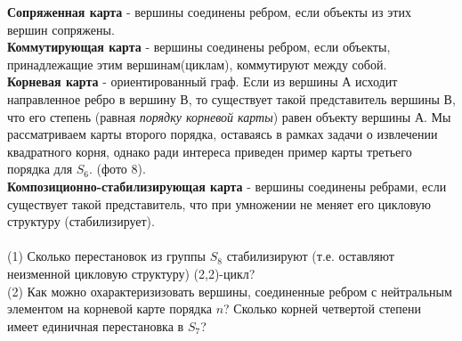 \documentclass[a4paper,12pt]{article}
\begin{document}
\textbf{Сопряженная карта }- вершины соединены ребром, если объекты из этих вершин сопряжены. \\
\textbf{Коммутирующая карта} - вершины соединены ребром, если объекты, принадлежащие этим вершинам(циклам), коммутируют между собой. \\
\textbf{Корневая карта }- ориентированный граф. Если из вершины А исходит направленное ребро в вершину В, то существует такой представитель вершины В, что его степень (равная \textit{порядку корневой карты}) равен объекту вершины А. Мы рассматриваем карты второго порядка, оставаясь в рамках задачи о извлечении квадратного корня, однако ради интереса приведен пример карты третьего порядка для $S_6$. (фото 8). \\
\textbf{Композиционно-стабилизирующая карта} - вершины соединены ребрами, если существует такой представитель, что при умножении не меняет его цикловую структуру (стабилизирует). \\
\\
(1) Сколько перестановок из группы $S_8$ стабилизируют (т.е. оставляют неизменной цикловую структуру) (2,2)-цикл? \\
(2) Как можно охарактеризизовать вершины, соединенные ребром с нейтральным элементом на корневой карте порядка $n$? Сколько корней четвертой степени имеет единичная перестановка в $S_7$? \\
\end{document}
